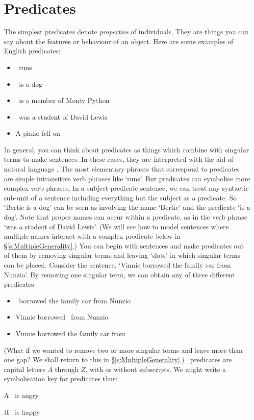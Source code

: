 \section{Predicates}
The simplest predicates denote \emph{properties} of individuals. They are things you can say about the features or behaviour of an object. Here are some examples of English predicates:
	\begin{itemize}
		\item \blank\ runs
		\item \blank\ is a dog
		\item \blank\ is a member of Monty Python
		\item \blank\ was a student of David Lewis 
		\item  A piano fell on \blank
	\end{itemize}
In general, you can think about predicates as things which combine with singular terms to make sentences. In these cases, they are interpreted with the aid of natural language . The most elementary phrases that correspond to predicates are simple intransitive verb phrases like `runs'. But predicates can symbolise more complex verb phrases. In a subject-predicate sentence, we can treat any syntactic sub-unit of a sentence including everything but the subject as a predicate. So `Bertie is a dog' can be seen as involving the name `Bertie' and the predicate `is a dog'. Note that proper names can occur within a predicate, as in the verb phrase `was a student of David Lewis'. (We will see how to model sentences where multiple names interact with a complex predicate below in §\ref{s:MultipleGenerality}.) You can begin with sentences and make predicates out of them by removing singular terms and leaving `slots' in which singular terms can be placed. Consider the sentence, `Vinnie borrowed the family car from Nunzio'. By removing one singular term, we can obtain any of three different predicates:
	\begin{itemize}
		\item \blank\ borrowed the family car from Nunzio
		\item Vinnie borrowed \blank\ from Nunzio
		\item Vinnie borrowed the family car from \blank
	\end{itemize} (What if we wanted to remove two or more singular terms and leave more than one gap? We shall return to this in §\ref{s:MultipleGenerality}.)
\FOL\ predicates are capital letters $A$ through $Z$, with or without subscripts. We might write a symbolisation key for predicates thus:
	\begin{ekey}
		\item[A] \blank\ is angry
		\item[H] \blank\ is happy
	\end{ekey}


